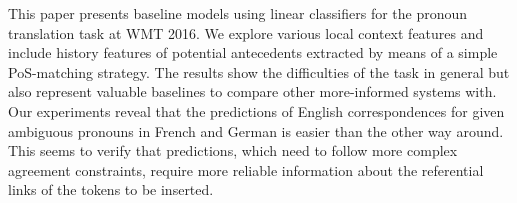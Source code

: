 This paper presents baseline models using linear classifiers for the pronoun translation task at WMT 2016. We explore various local context features and include history features of potential antecedents extracted by means of a simple PoS-matching strategy. The results show the difficulties of the task in general but also represent valuable baselines to compare other more-informed systems with. Our experiments reveal that the predictions of English correspondences for given ambiguous pronouns in French and German is easier than the other way around. This seems to verify that predictions, which need to follow more complex agreement constraints, require more reliable information about the referential links of the tokens to be inserted.

